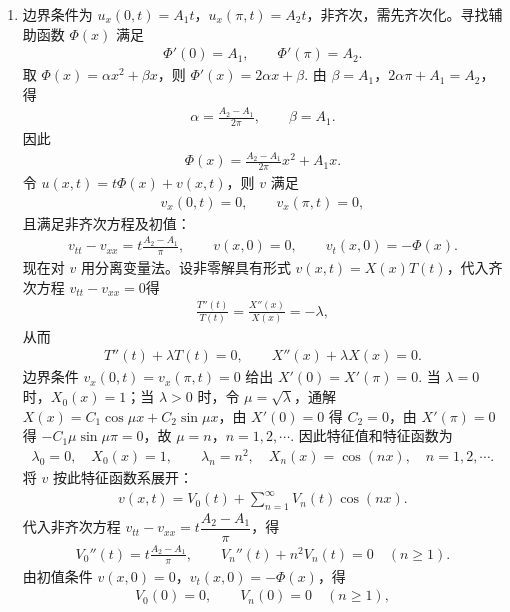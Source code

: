 \documentclass[../../main.tex]{subfiles}%
\begin{document}
\begin{solution}
\begin{enumerate}[(1)]
\item 边界条件为 $u_x(0,t)=A_1t$，$u_x(\pi,t)=A_2t$，非齐次，需先齐次化。寻找辅助函数 $\Phi(x)$ 满足
\begin{align*}
\Phi'(0)=A_1,\qquad \Phi'(\pi)=A_2.
\end{align*}
取 $\Phi(x)=\alpha x^2+\beta x$，则 $\Phi'(x)=2\alpha x+\beta$. 由 $\beta=A_1$，$2\alpha\pi+A_1=A_2$，得
\begin{align*}
\alpha=\frac{A_2-A_1}{2\pi},\qquad \beta=A_1.
\end{align*}
因此
\begin{align*}
\Phi(x)=\frac{A_2-A_1}{2\pi}x^2+A_1x.
\end{align*}
令 $u(x,t)=t\Phi(x)+v(x,t)$，则 $v$ 满足
\begin{align*}
v_x(0,t)=0,\qquad v_x(\pi,t)=0,
\end{align*}
且满足非齐次方程及初值：
\begin{align*}
v_{tt}-v_{xx}=t\frac{A_2-A_1}{\pi},\qquad
v(x,0)=0,\qquad v_t(x,0)=-\Phi(x).
\end{align*}
现在对 $v$ 用分离变量法。设非零解具有形式 $v(x,t)=X(x)T(t)$，代入齐次方程 $v_{tt}-v_{xx}=0$得
\begin{align*}
\frac{T''(t)}{T(t)}=\frac{X''(x)}{X(x)}=-\lambda,
\end{align*}
从而
\begin{align*}
T''(t)+\lambda T(t)=0,\qquad X''(x)+\lambda X(x)=0.
\end{align*}
边界条件 $v_x(0,t)=v_x(\pi,t)=0$ 给出 $X'(0)=X'(\pi)=0$. 当 $\lambda=0$ 时，$X_0(x)=1$；当 $\lambda>0$ 时，令 $\mu=\sqrt{\lambda}$，通解 $X(x)=C_1\cos \mu x+C_2\sin \mu x$，由 $X'(0)=0$ 得 $C_2=0$，由 $X'(\pi)=0$ 得 $-C_1\mu\sin \mu\pi=0$，故 $\mu=n$，$n=1,2,\cdots$. 因此特征值和特征函数为
\begin{align*}
\lambda_0=0,\quad X_0(x)=1,\qquad
\lambda_n=n^2,\quad X_n(x)=\cos(nx),\quad n=1,2,\cdots.
\end{align*}
将 $v$ 按此特征函数系展开：
\begin{align*}
v(x,t)=V_0(t)+\sum_{n=1}^{\infty}V_n(t)\cos(nx).
\end{align*}
代入非齐次方程 $v_{tt}-v_{xx}=t\dfrac{A_2-A_1}{\pi}$，得
\begin{align*}
V_0''(t)=t\frac{A_2-A_1}{\pi},\qquad
V_n''(t)+n^2V_n(t)=0\quad(n\geqslant 1).
\end{align*}
由初值条件 $v(x,0)=0$，$v_t(x,0)=-\Phi(x)$，得
\begin{align*}
V_0(0)=0,\qquad V_n(0)=0\quad(n\geqslant 1),
\end{align*}

\end{enumerate}
\end{solution}
\end{document}
